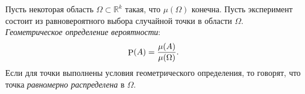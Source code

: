 \begin{to_def}
    Пусть некоторая область $\Omega \subset \mathbb{R}^k$ такая, что $\mu(\Omega)$ конечна. Пусть эксперимент состоит из равновероятного выбора случайной точки в области $\Omega$. \textit{Геометрическое определение вероятности}:
    \begin{equation*}
        \P (A) = \frac{\mu(A)}{\mu (\Omega)}.
    \end{equation*}
    Если для точки выполнены условия геометрического определения, то говорят, что точка \textit{равномерно распределена} в $\Omega$. 
\end{to_def}


